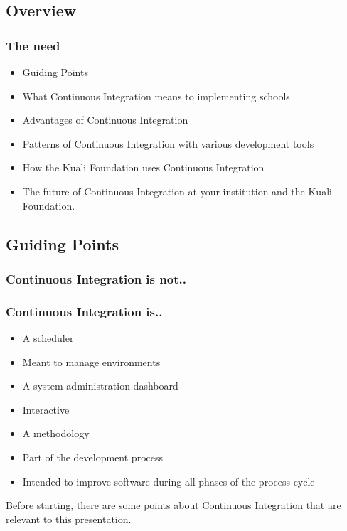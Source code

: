 \documentclass[12pt,notitlepage]{article}
\author{Farooq Sadiq and Leo Przybylski}
\begin{document}
  \W \begin{s5presentation}
  \maketitle
  \W \begin{s5slide}
    \section{Overview}
    \subsubsection{The need}
    \begin{itemize}
      \item Guiding Points
      \item What Continuous Integration means to implementing schools
      \item Advantages of Continuous Integration
      \item Patterns of Continuous Integration with various development tools
      \item How the Kuali Foundation uses Continuous Integration
      \item The future of Continuous Integration at your institution
    and the Kuali Foundation.
    \end{itemize}
  \W \end {s5slide}
  \W \begin{s5slide}
    \section{Guiding Points}
      \subsubsection{Continuous Integration is not..}
      \begin{itemize}
      \end{itemize}
      \subsubsection{Continuous Integration is..}
      \begin{itemize}
        \item A scheduler
        \item Meant to manage environments
        \item A system administration dashboard
        \item Interactive
        \item A methodology
        \item Part of the development process
        \item Intended to improve software during all phases of the process cycle
      \end{itemize}
    \W \begin{s5notes}
    Before starting, there are some points about Continuous Integration that are relevant to 
    this presentation.


\end{s5notes}
\end{s5slide}
\end{s5presentation}
\end{document}
